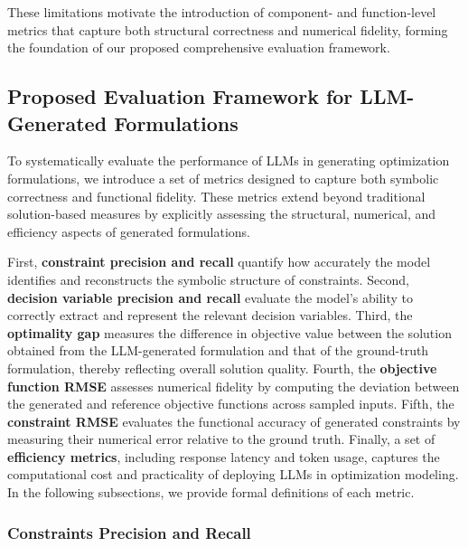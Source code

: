 \documentclass[review,12pt]{elsarticle}
\begin{document}
\vspace{-3mm}
These limitations motivate the introduction of component- and function-level metrics that capture both structural correctness and numerical fidelity, forming the foundation of our proposed comprehensive evaluation framework.

\vspace{-3mm}
\subsection{Proposed Evaluation Framework for LLM-Generated Formulations}\label{Evaluation}

To systematically evaluate the performance of LLMs in generating optimization formulations, we introduce a set of metrics designed to capture both symbolic correctness and functional fidelity. These metrics extend beyond traditional solution-based measures by explicitly assessing the structural, numerical, and efficiency aspects of generated formulations. 

First, \textbf{constraint precision and recall} quantify how accurately the model identifies and reconstructs the symbolic structure of constraints. 
Second, \textbf{decision variable precision and recall} evaluate the model’s ability to correctly extract and represent the relevant decision variables. 
Third, the \textbf{optimality gap} measures the difference in objective value between the solution obtained from the LLM-generated formulation and that of the ground-truth formulation, thereby reflecting overall solution quality. 
Fourth, the \textbf{objective function RMSE} assesses numerical fidelity by computing the deviation between the generated and reference objective functions across sampled inputs. 
Fifth, the \textbf{constraint RMSE} evaluates the functional accuracy of generated constraints by measuring their numerical error relative to the ground truth. 
Finally, a set of \textbf{efficiency metrics}, including response latency and token usage, captures the computational cost and practicality of deploying LLMs in optimization modeling. In the following subsections, we provide formal definitions of each metric.

\vspace{-3mm}
\subsubsection{Constraints Precision and Recall}\label{constraints}
\end{document}
